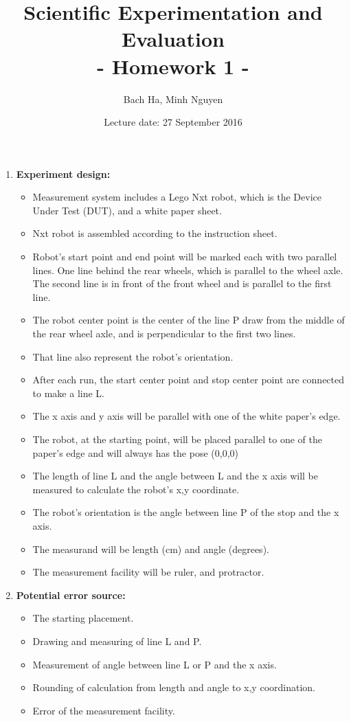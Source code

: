 \documentclass[a4paper, 12pt]{article}
\title{Scientific Experimentation and Evaluation \\
				- Homework 1 -}
\author{Bach Ha, Minh Nguyen}
\date{Lecture date: 27 September 2016}
\begin{document}
\maketitle


\begin{enumerate}
	\item \textbf{Experiment design:}
	\begin{itemize}
		\item Measurement system includes a Lego Nxt robot, which is the Device Under Test (DUT), and a white paper sheet.
		\item Nxt robot is assembled according to the instruction sheet.
		\item Robot's start point and end point will be marked each with two parallel lines. One line behind the rear wheels, which is parallel to the wheel axle. The second line is in front of the front wheel and is parallel to the first line.
		\item The robot center point is the center of the line P draw from the middle of the rear wheel axle, and is perpendicular to the first two lines.
		\item That line also represent the robot's orientation.
 		\item After each run, the start center point and stop center point are connected to make a line L.
		\item The x axis and y axis will be parallel with one of the white paper's edge.
		\item The robot, at the starting point, will be placed parallel to one of the paper's edge and will always has the pose (0,0,0)
		\item The length of line L and the angle between L and the x axis will be measured to calculate the robot's x,y coordinate.
		\item The robot's orientation is the angle between line P of the stop and the x axis.
		\item The measurand will be length (cm) and angle (degrees).
		\item The measurement facility will be ruler, and protractor.
	\end{itemize}
	
	\item \textbf{Potential error source:}
	\begin{itemize}
		\item The starting placement.
		\item Drawing and measuring of line L and P.
		\item Measurement of angle between line L or P and the x axis.
		\item Rounding of calculation from length and angle to x,y coordination.
		\item Error of the measurement facility.
	\end{itemize}
	
\end{enumerate}
\end{document}
